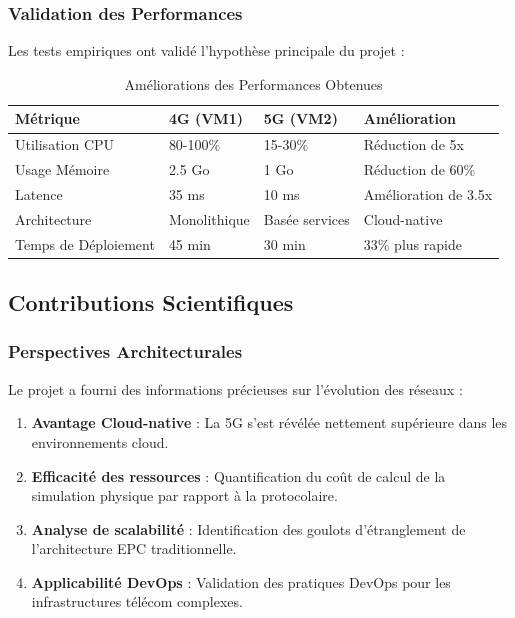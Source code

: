 \documentclass[12pt,a4paper]{report}
\begin{document}
\subsubsection{Validation des Performances}

Les tests empiriques ont validé l'hypothèse principale du projet :

\begin{table}[H]
\centering
\caption{Améliorations des Performances Obtenues}
\label{tab:performance-results}
\begin{tabular}{@{}llll@{}}
\toprule
Métrique & 4G (VM1) & 5G (VM2) & Amélioration \\
\midrule
Utilisation CPU & 80-100\% & 15-30\% & Réduction de 5x \\
Usage Mémoire & 2.5 Go & 1 Go & Réduction de 60\% \\
Latence & 35 ms & 10 ms & Amélioration de 3.5x \\
Architecture & Monolithique & Basée services & Cloud-native \\
Temps de Déploiement & 45 min & 30 min & 33\% plus rapide \\
\bottomrule
\end{tabular}
\end{table}

\subsection{Contributions Scientifiques}

\subsubsection{Perspectives Architecturales}

Le projet a fourni des informations précieuses sur l'évolution des réseaux :

\begin{enumerate}
    \item \textbf{Avantage Cloud-native} : La 5G s'est révélée nettement supérieure dans les environnements cloud.
    \item \textbf{Efficacité des ressources} : Quantification du coût de calcul de la simulation physique par rapport à la protocolaire.
    \item \textbf{Analyse de scalabilité} : Identification des goulots d'étranglement de l'architecture EPC traditionnelle.
    \item \textbf{Applicabilité DevOps} : Validation des pratiques DevOps pour les infrastructures télécom complexes.
\end{enumerate}
\end{document}
